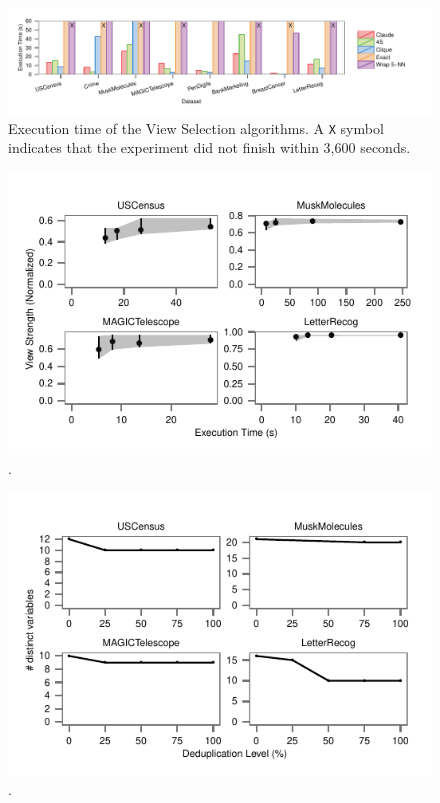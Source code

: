\begin{figure}[t!]
\centering
\includegraphics[width=2\columnwidth]{plots/view-times}
\caption{Execution time of the View Selection algorithms. A \texttt{X} symbol
indicates that the experiment did not finish within 3,600 seconds.}
\label{pic:column-select-time}
\end{figure}

\begin{figure}[t!]
\centering
\includegraphics[width=\columnwidth]{plots/view-vary-beam}
\caption{.}
\label{pic:view-beam}
\end{figure}

\begin{figure}[t!]
\centering
\includegraphics[width=\columnwidth]{plots/view-vary-diversification}
\caption{.}
\label{pic:view-diversification}
\end{figure}


